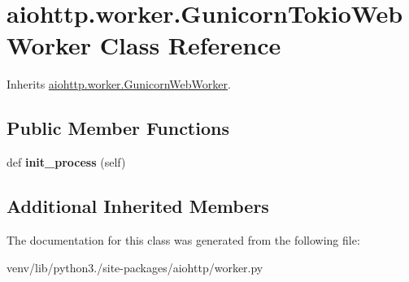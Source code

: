 \hypertarget{classaiohttp_1_1worker_1_1_gunicorn_tokio_web_worker}{}\section{aiohttp.\+worker.\+Gunicorn\+Tokio\+Web\+Worker Class Reference}
\label{classaiohttp_1_1worker_1_1_gunicorn_tokio_web_worker}


Inherits \hyperlink{classaiohttp_1_1worker_1_1_gunicorn_web_worker}{aiohttp.\+worker.\+Gunicorn\+Web\+Worker}.

\subsection*{Public Member Functions}
\begin{DoxyCompactItemize}
\item 
\mbox{\label{classaiohttp_1_1worker_1_1_gunicorn_tokio_web_worker_afa0bc5f8744eec653be1c7c7c4164ea5}} 
def {\bfseries init\+\_\+process} (self)
\end{DoxyCompactItemize}
\subsection*{Additional Inherited Members}


The documentation for this class was generated from the following file\+:\begin{DoxyCompactItemize}
\item 
venv/lib/python3./site-\/packages/aiohttp/worker.\+py\end{DoxyCompactItemize}
